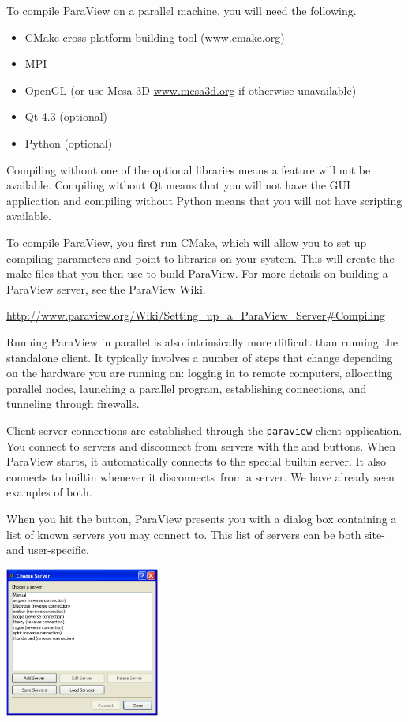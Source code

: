 To compile ParaView on a parallel machine, you will need the following.

\begin{itemize}
\item CMake cross-platform building tool
  (\href{http://www.cmake.org}{www.cmake.org})
\item MPI
\item OpenGL (or use Mesa 3D \href{http://www.mesa3d.org}{www.mesa3d.org}
  if otherwise unavailable)
\item Qt 4.3 (optional)
\item Python (optional)
\end{itemize}

Compiling without one of the optional libraries means a feature will not be
available.  Compiling without Qt means that you will not have the GUI
application and compiling without Python means that you will not have
scripting available.

To compile ParaView, you first run CMake, which will allow you to set up
compiling parameters and point to libraries on your system.  This will
create the make files that you then use to build ParaView.  For more
details on building a ParaView server, see the ParaView Wiki.

{
  \footnotesize
  \href{http://www.paraview.org/Wiki/Setting_up_a_ParaView_Server#Compiling}{http://www.paraview.org/Wiki/Setting\_up\_a\_ParaView\_Server\#Compiling}
}

Running ParaView in parallel is also intrinsically more difficult than
running the standalone client.  It typically involves a number of steps
that change depending on the hardware you are running on: logging in to
remote computers, allocating parallel nodes, launching a parallel program,
establishing connections, and tunneling through firewalls.

Client-server connections are established through the \texttt{paraview}
client application.  You connect to servers and disconnect from servers
with the \connect and \disconnect buttons.  When ParaView starts, it
automatically connects to the special builtin server.  It also connects to
builtin whenever it disconnects~\disconnect from a server.  We have already
seen examples of both.

When you hit the \connect button, ParaView presents you with a dialog box
containing a list of known servers you may connect to.  This list of
servers can be both site- and user-specific.

\begin{inlinefig}
  \includegraphics[width=2in]{images/ChooseServer}
\end{inlinefig}


